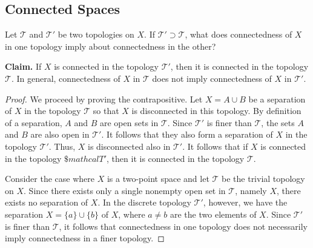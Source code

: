 \subsection{Connected Spaces}

\begin{exercise}[ID=3.23.1]
  Let $\mathcal{T}$ and $\mathcal{T}'$ be two topologies on $X$.
  If $\mathcal{T}' \supset \mathcal{T}$, what does connectedness of $X$ in one topology imply about connectedness in the other?
\end{exercise}
%
\begin{solution}
  \textbf{Claim.} If $X$ is connected in the topology $\mathcal{T'}$, then it is connected in the topology $\mathcal{T}$.
  In general, connectedness of $X$ in $\mathcal{T}$ does not imply connectedness of $X$ in $\mathcal{T}'$.
  \begin{proof}
    We proceed by proving the contrapositive.
    Let $X = A \cup B$ be a separation of $X$ in the topology $\mathcal{T}$ so that $X$ is disconnected in this topology.
    By definition of a separation, $A$ and $B$ are open sets in $\mathcal{T}$.
    Since $\mathcal{T}'$ is finer than $\mathcal{T}$, the sets $A$ and $B$ are also open in $\mathcal{T}'$.
    It follows that they also form a separation of $X$ in the topology $\mathcal{T}'$.
    Thus, $X$ is disconnected also in $\mathcal{T}'$.
    It follows that if $X$ is connected in the topology $\$mathcal{T'}$, then it is connected in the topology $\mathcal{T}$.

    Consider the case where $X$ is a two-point space and let $\mathcal{T}$ be the trivial topology on $X$.
    Since there exists only a single nonempty open set in $\mathcal{T}$, namely $X$, there exists no separation of $X$.
    In the discrete topology $\mathcal{T}'$, however, we have the separation $X = \{a\} \cup \{b\}$ of $X$, where $a \neq b$ are the two elements of $X$.
    Since $\mathcal{T}'$ is finer than $\mathcal{T}$, it follows that connectedness in one topology does not necessarily imply connectedness in a finer topology.
  \end{proof}
\end{solution}
\newpage

